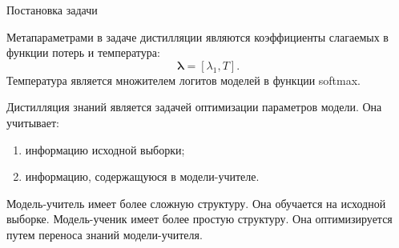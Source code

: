 \documentclass[12pt, aspectratio=169]{beamer}
\begin{document}
\begin{frame}{Постановка задачи}

    
    {\color{red}Метапараметрами} \boldsymbol{\lambda} в задаче дистилляции являются коэффициенты слагаемых в функции потерь и температура:
    $$\boldsymbol{\lambda} = [\lambda_1, T].$$
    Температура является множителем логитов моделей в функции softmax.
    
    {\color{red}Дистилляция знаний} является задачей оптимизации параметров модели. Она учитывает:
    \begin{enumerate}
        \item информацию исходной выборки;
        \item информацию, содержащуюся в модели-учителе.
    \end{enumerate}
    
    \vspace{0.2 cm}
    
    {\color{red}Модель-учитель} имеет более сложную структуру. Она обучается на исходной выборке. {\color{red}Модель-ученик} имеет более простую структуру. Она оптимизируется путем переноса знаний модели-учителя.
    
\end{frame}



\end{document}
